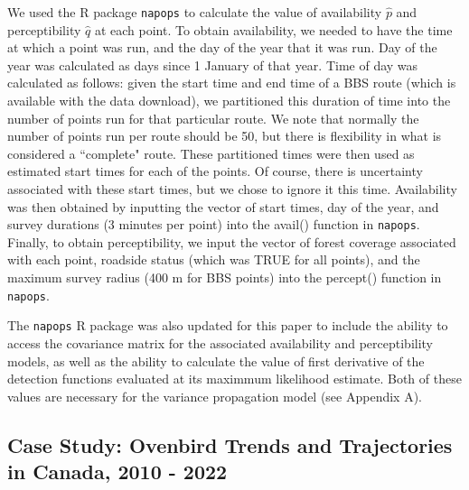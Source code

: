 \documentclass[12pt]{article}
\begin{document}
\par We used the R package \texttt{napops} \citep{edwards_napops_2024} to calculate the value of availability $\hat{p}$ and perceptibility $\hat{q}$ at each point.
To obtain availability, we needed to have the time at which a point was run, and the day of the year that it was run.
Day of the year was calculated as days since 1 January of that year.
Time of day was calculated as follows: given the start time and end time of a BBS route (which is available with the data download), we partitioned this duration of time into the number of points run for that particular route.
We note that normally the number of points run per route should be 50, but there is flexibility in what is considered a ``complete" route.
These partitioned times were then used as estimated start times for each of the points. 
Of course, there is uncertainty associated with these start times, but we chose to ignore it this time.
Availability was then obtained by inputting the vector of start times, day of the year, and survey durations (3 minutes per point) into the avail() function in \texttt{napops}.
Finally, to obtain perceptibility, we input the vector of forest coverage associated with each point, roadside status (which was TRUE for all points), and the maximum survey radius (400 m for BBS points) into the percept() function in \texttt{napops}.

\par The \texttt{napops} R package was also updated for this paper to include the ability to access the covariance matrix for the associated availability and perceptibility models, as well as the ability to calculate the value of first derivative of the detection functions evaluated at its maximmum likelihood estimate.
Both of these values are necessary for the variance propagation model (see Appendix A).

\subsection{Case Study: Ovenbird Trends and Trajectories in Canada, 2010 - 2022}
\end{document}

